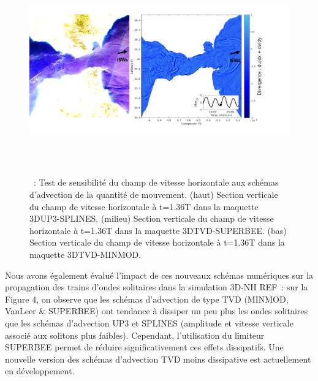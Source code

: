 \documentclass[12pt]{article}
\begin{document}
\vspace{\baselineskip}



\begin{figure}[H]
	\begin{Center}
		\includegraphics[width=6.29in,height=3.55in]{./media/image4.png}
		\caption{ : Test de sensibilité du champ de vitesse horizontale aux schémas d’advection de la quantité de mouvement. (haut) Section verticale du champ de vitesse horizontale à t=1.36T dans la maquette 3DUP3-SPLINES. (milieu) Section verticale du champ de vitesse horizontale à t=1.36T dans la maquette 3DTVD-SUPERBEE. (bas) Section verticale du champ de vitesse horizontale à t=1.36T dans la maquette 3DTVD-MINMOD.}
		\label{fig:_Test_de_sensibilit_du_champ_de_vitesse_horizontale_aux_schmas_dadvection_de_la_quantit_de_mouvement_haut_Section_verticale_du_champ_de_vitesse_horizontale__t136T_dans_la_maquette_3DUP3SPLINES_milieu_Section_verticale_du_champ_de_vitesse_horizontale__t136T_dans_la_maquette_3DTVDSUPERBEE_bas_Section_verticale_du_champ_de_vitesse_horizontale__t136T_dans_la_maquette_3DTVDMINMOD}
	\end{Center}
\end{figure}



\par

\par

\begin{justify}
Nous avons également évalué l’impact de ces nouveaux schémas numériques sur la propagation des trains d’ondes solitaires dans la simulation 3D-NH REF : sur la Figure 4, on observe que les schémas d’advection de type TVD (MINMOD, VanLeer $\&$  SUPERBEE) ont tendance à dissiper un peu plus les ondes solitaires que les schémas d’advection UP3 et SPLINES (amplitude et vitesse verticale associé aux solitons plus faibles). Cependant, l’utilisation du limiteur SUPERBEE permet de réduire significativement ces effets dissipatifs. Une nouvelle version des schémas d’advection TVD moins dissipative est actuellement en développement.
\end{justify}\par
\end{document}
